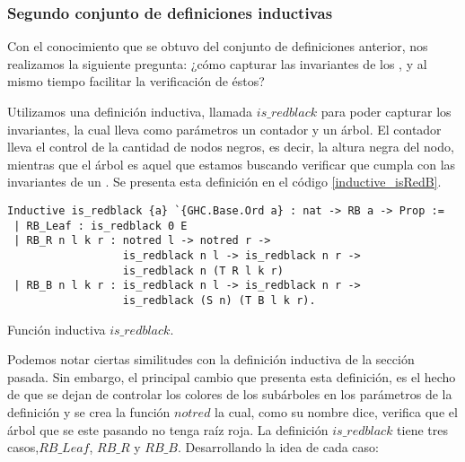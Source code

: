 \subsubsection{Segundo conjunto de definiciones inductivas}

Con el conocimiento que se obtuvo del conjunto de definiciones anterior, nos realizamos la
siguiente pregunta: ¿c\'omo capturar las invariantes de los {\arns}, y al mismo tiempo facilitar la
verificaci\'on de \'estos?

Utilizamos una definición inductiva, llamada \hyperref[inductive_isRedB]{$is\_redblack$} para poder 
capturar los invariantes, la cual lleva como parámetros un contador y un \'arbol. El contador lleva 
el control de la cantidad de nodos negros, es decir, la altura negra del nodo, mientras que el 
\'arbol es aquel que estamos buscando verificar que cumpla con las invariantes de un {\arn}. Se 
presenta esta definici\'on en el c\'odigo \ref{inductive_isRedB}.

\begin{listing}[!ht]
\centering
\captionsetup{justification=centering}
\begin{verbatim}
Inductive is_redblack {a} `{GHC.Base.Ord a} : nat -> RB a -> Prop :=
 | RB_Leaf : is_redblack 0 E
 | RB_R n l k r : notred l -> notred r ->
                  is_redblack n l -> is_redblack n r ->
                  is_redblack n (T R l k r)
 | RB_B n l k r : is_redblack n l -> is_redblack n r ->
                  is_redblack (S n) (T B l k r).
\end{verbatim}
\caption{Funci\'on inductiva $is\_redblack$.}
\label{inductive_isRedB}
\end{listing}

Podemos notar ciertas similitudes con la definición inductiva de la secci\'on pasada. Sin
embargo, el principal cambio que presenta esta definición, es el hecho de que se dejan de controlar
los colores de los subárboles en los parámetros de la definici\'on y se crea la funci\'on $notred$
la cual, como su nombre dice, verifica que el \'arbol que se este pasando no tenga raíz roja. La
definici\'on \hyperref[inductive_isRedB]{$is\_redblack$} tiene tres casos,$RB\_Leaf$, $RB\_R$ y 
$RB\_B$. Desarrollando la idea de cada caso:

